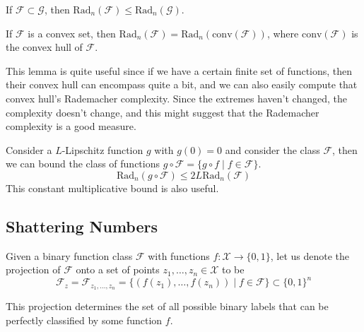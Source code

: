   \begin{lemma}
    If $\mathcal{F} \subset \mathcal{G}$, then $\mathrm{Rad}_n (\mathcal{F}) \leq \mathrm{Rad}_n (\mathcal{G})$.
  \end{lemma}

  \begin{lemma}
    If $\mathcal{F}$ is a convex set, then $\mathrm{Rad}_n (\mathcal{F}) = \mathrm{Rad}_n (\mathrm{conv}(\mathcal{F}))$, where $\mathrm{conv}(\mathcal{F})$ is the convex hull of $\mathcal{F}$.
  \end{lemma}

  This lemma is quite useful since if we have a certain finite set of functions, then their convex hull can encompass quite a bit, and we can also easily compute that convex hull's Rademacher complexity. Since the extremes haven't changed, the complexity doesn't change, and this might suggest that the Rademacher complexity is a good measure. 

  \begin{lemma}
    Consider a $L$-Lipschitz function $g$  with $g(0) = 0$ and consider the class $\mathcal{F}$, then we can bound the class of functions $g \circ \mathcal{F} = \{ g \circ f \mid f \in \mathcal{F} \}$. 
    \begin{equation}
      \mathrm{Rad}_n (g \circ \mathcal{F}) \leq 2 L \mathrm{Rad}_n (\mathcal{F})
    \end{equation}
    This constant multiplicative bound is also useful. 
  \end{lemma}

\subsection{Shattering Numbers}

  \begin{definition}
    Given a binary function class $\mathcal{F}$ with functions $f: \mathcal{X} \rightarrow \{0, 1\}$, let us denote the projection of $\mathcal{F}$ onto a set of points $z_1, \ldots, z_n \in \mathcal{X}$ to be 
    \begin{equation}
      \mathcal{F}_z = \mathcal{F}_{z_1, \ldots, z_n} = \{ (f(z_1), \ldots, f(z_n)) \mid f \in \mathcal{F} \} \subset \{0, 1\}^n
    \end{equation}
  \end{definition}

  This projection determines the set of all possible binary labels that can be perfectly classified by some function $f$. 

